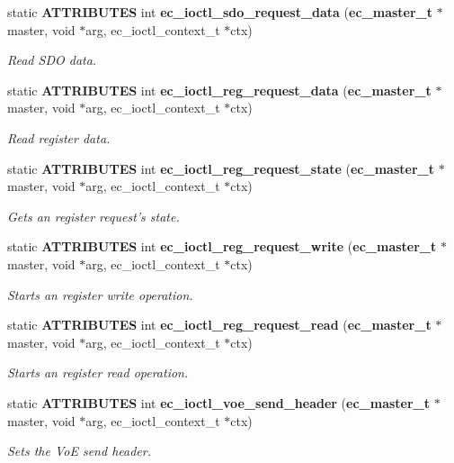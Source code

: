 \begin{DoxyCompactItemize}
static {\bf \-A\-T\-T\-R\-I\-B\-U\-T\-E\-S} int {\bf ec\-\_\-ioctl\-\_\-sdo\-\_\-request\-\_\-data} ({\bf ec\-\_\-master\-\_\-t} $\ast$master, void $\ast$arg, ec\-\_\-ioctl\-\_\-context\-\_\-t $\ast$ctx)
\begin{DoxyCompactList}\small\item\em \-Read \-S\-D\-O data. \end{DoxyCompactList}\item 
static {\bf \-A\-T\-T\-R\-I\-B\-U\-T\-E\-S} int {\bf ec\-\_\-ioctl\-\_\-reg\-\_\-request\-\_\-data} ({\bf ec\-\_\-master\-\_\-t} $\ast$master, void $\ast$arg, ec\-\_\-ioctl\-\_\-context\-\_\-t $\ast$ctx)
\begin{DoxyCompactList}\small\item\em \-Read register data. \end{DoxyCompactList}\item 
static {\bf \-A\-T\-T\-R\-I\-B\-U\-T\-E\-S} int {\bf ec\-\_\-ioctl\-\_\-reg\-\_\-request\-\_\-state} ({\bf ec\-\_\-master\-\_\-t} $\ast$master, void $\ast$arg, ec\-\_\-ioctl\-\_\-context\-\_\-t $\ast$ctx)
\begin{DoxyCompactList}\small\item\em \-Gets an register request's state. \end{DoxyCompactList}\item 
static {\bf \-A\-T\-T\-R\-I\-B\-U\-T\-E\-S} int {\bf ec\-\_\-ioctl\-\_\-reg\-\_\-request\-\_\-write} ({\bf ec\-\_\-master\-\_\-t} $\ast$master, void $\ast$arg, ec\-\_\-ioctl\-\_\-context\-\_\-t $\ast$ctx)
\begin{DoxyCompactList}\small\item\em \-Starts an register write operation. \end{DoxyCompactList}\item 
static {\bf \-A\-T\-T\-R\-I\-B\-U\-T\-E\-S} int {\bf ec\-\_\-ioctl\-\_\-reg\-\_\-request\-\_\-read} ({\bf ec\-\_\-master\-\_\-t} $\ast$master, void $\ast$arg, ec\-\_\-ioctl\-\_\-context\-\_\-t $\ast$ctx)
\begin{DoxyCompactList}\small\item\em \-Starts an register read operation. \end{DoxyCompactList}\item 
static {\bf \-A\-T\-T\-R\-I\-B\-U\-T\-E\-S} int {\bf ec\-\_\-ioctl\-\_\-voe\-\_\-send\-\_\-header} ({\bf ec\-\_\-master\-\_\-t} $\ast$master, void $\ast$arg, ec\-\_\-ioctl\-\_\-context\-\_\-t $\ast$ctx)
\begin{DoxyCompactList}\small\item\em \-Sets the \-Vo\-E send header. \end{DoxyCompactList}\item 

\end{DoxyCompactItemize}
